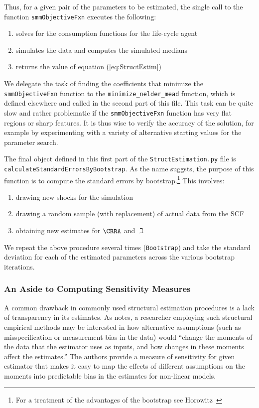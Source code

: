 \documentclass[titlepage, headings=optiontotocandhead]{econtex}
\begin{document}
Thus, for a given pair of the parameters to be estimated, the single
call to the function \texttt{smmObjectiveFxn} executes the following:
\begin{enumerate}
\item solves for the consumption functions for the life-cycle agent
\item simulates the data and computes the simulated medians
\item returns the value of equation (\ref{eq:StructEstim})
\end{enumerate}

We delegate the task of finding the coefficients that minimize the \texttt{smmObjectiveFxn} function to the \texttt{minimize\_nelder\_mead} function, which is defined elsewhere and called in the second part of this file.  This task can be quite slow and rather problematic if the \texttt{smmObjectiveFxn} function has very flat regions or sharp features. It is thus wise to verify the accuracy of the solution, for example by experimenting with a variety of alternative starting values for the parameter search.

The final object defined in this first part of the \texttt{StructEstimation.py}
file is \texttt{calculateStandardErrorsByBootstrap}. As the name suggsts, the
purpose of this function is to compute the standard errors by bootstrap.\footnote{For a
  treatment of the advantages of the bootstrap see
  Horowitz~\citeyearpar{horowitzBootstrap}} This involves:
\begin{enumerate}
\item drawing new shocks for the simulation
\item drawing a random sample (with replacement) of actual data from the SCF
\item obtaining new estimates for $\CRRA$ and $\beth$
\end{enumerate}
We repeat the above procedure several times (\texttt{Bootstrap}) and
take the standard deviation for each of the estimated parameters across the various bootstrap iterations.

\subsubsection{An Aside to Computing Sensitivity Measures}\label{subsubsec:sensmeas}


A common drawback in commonly used structural estimation procedures is a lack of transparency in its estimates.  As \cite{andrews2017measuring} notes, a researcher employing such structural empirical methods may be interested in how alternative assumptions (such as misspecification or measurement bias in the data) would ``change the moments of the data that the estimator uses as inputs, and how changes in these moments affect the estimates.'' The authors provide a measure of sensitivity for given estimator that makes it easy to map the effects of different assumptions on the moments into predictable bias in the estimates for non-linear models.
\end{document}
